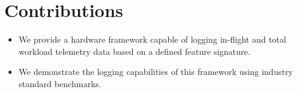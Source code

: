\documentclass[../bachelor_paper.tex]{subfiles}
\begin{document}
\section{Contributions}
\begin{itemize}
\item We provide a hardware framework capable of logging in-flight and total workload telemetry data based on a defined feature signature.
\item We demonstrate the logging capabilities of this framework using industry standard benchmarks.
\end{itemize}

\isstandalone



\fi
\end{document}
